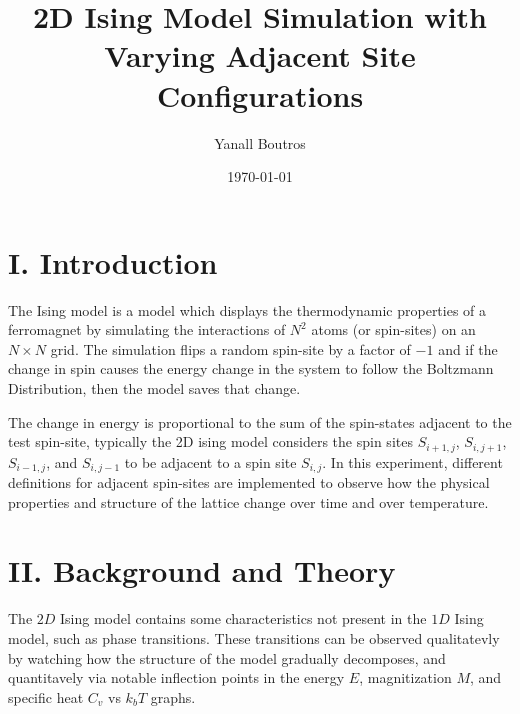 \documentclass{article}
\begin{document}
\title{2D Ising Model Simulation with Varying Adjacent Site Configurations}
\author{Yanall Boutros}
\date{\today}
\maketitle
\section*{I. Introduction}
\indent \indent The Ising model is a model which displays the thermodynamic
properties of a ferromagnet by simulating the interactions of $N^2$  atoms
(or spin-sites) on an $N\times N$ grid. The simulation flips a random spin-site
by a factor of $-1$ and if the change in spin causes the energy change in the
system to follow the Boltzmann Distribution, then the model saves that change.

\indent The change in energy is proportional to the sum of the spin-states
adjacent to the test spin-site, typically the 2D ising model considers the 
spin sites $S_{i+1, j}$, $S_{i, j+1}$, $S_{i-1, j}$, and $S_{i, j-1}$ to 
be adjacent to a spin site $S_{i, j}$. In this experiment, different definitions
for adjacent spin-sites are implemented to observe how the physical properties
and structure of the lattice change over time and over temperature.
\section*{II. Background and Theory}
\indent \indent The $2D$ Ising model contains some characteristics not present
in the $1D$ Ising model, such as phase transitions. These transitions can be
observed qualitatevly by watching how the structure of the model gradually 
decomposes, and quantitavely via notable inflection points in the energy $E$,
magnitization $M$, and specific heat $C_v$ vs $k_bT$ graphs.
\end{document}
